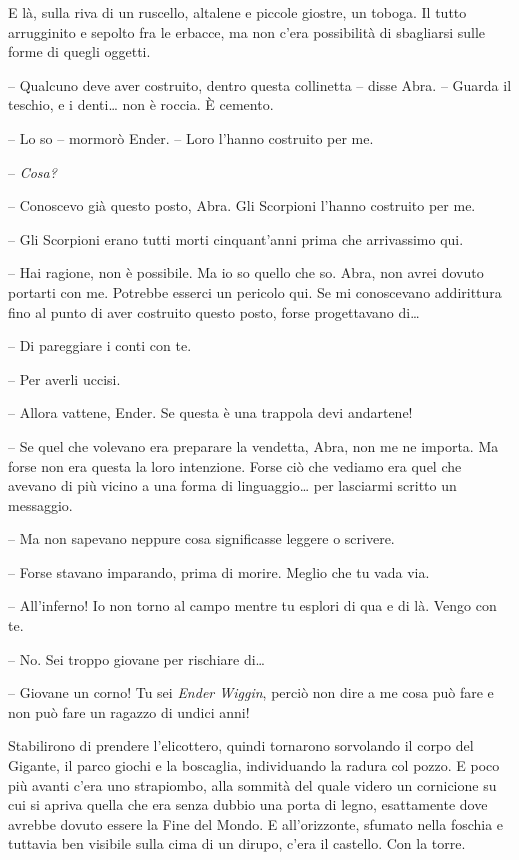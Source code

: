 {E là, sulla riva di un ruscello, altalene e piccole giostre, un toboga.
	Il tutto arrugginito e sepolto fra le erbacce, ma non c'era possibilità
	di sbagliarsi sulle forme di quegli oggetti.}

{-- Qualcuno deve aver costruito, dentro questa collinetta -- disse
	Abra. -- Guarda il teschio, e i denti\ldots{} non è roccia. È cemento.}

{-- Lo so -- mormorò Ender. -- Loro l'hanno costruito per me.}

{-- \emph{Cosa?}}

{-- Conoscevo già questo posto, Abra. Gli Scorpioni l'hanno costruito
	per me.}

{-- Gli Scorpioni erano tutti morti cinquant'anni prima che arrivassimo
	qui.}

{-- Hai ragione, non è possibile. Ma io so quello che so. Abra, non
	avrei dovuto portarti con me. Potrebbe esserci un pericolo qui. Se mi
	conoscevano addirittura fino al punto di aver costruito questo posto,
	forse progettavano di\ldots{}}

{-- Di pareggiare i conti con te.}

{-- Per averli uccisi.}

{-- Allora vattene, Ender. Se questa è una trappola devi andartene!}

{-- Se quel che volevano era preparare la vendetta, Abra, non me ne
	importa. Ma forse non era questa la loro intenzione. Forse ciò che
	vediamo era quel che avevano di più vicino a una forma di
	linguaggio\ldots{} per lasciarmi scritto un messaggio.}

{-- Ma non sapevano neppure cosa significasse leggere o scrivere.}

{-- Forse stavano imparando, prima di morire. Meglio che tu vada via.}

{-- All'inferno! Io non torno al campo mentre tu esplori di qua e di là.
	Vengo con te.}

{-- No. Sei troppo giovane per rischiare di\ldots{}}

{-- Giovane un corno! Tu sei \emph{Ender Wiggin}, \emph{} perciò non
	dire a me cosa può fare e non può fare un ragazzo di undici anni!}

{Stabilirono di prendere l'elicottero, quindi tornarono sorvolando il
	corpo del Gigante, il parco giochi e la boscaglia, individuando la
	radura col pozzo. E poco più avanti c'era uno strapiombo, alla sommità
	del quale videro un cornicione su cui si apriva quella che era senza
	dubbio una porta di legno, esattamente dove avrebbe dovuto essere la
	Fine del Mondo. E all'orizzonte, sfumato nella foschia e tuttavia ben
	visibile sulla cima di un dirupo, c'era il castello. Con la torre.}

